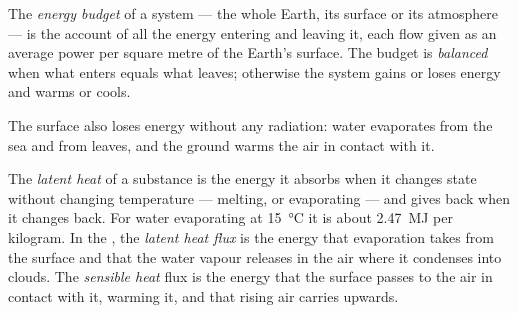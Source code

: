 \begin{definition}\label{def:g10:earth-energy-budget:energy-budget}
The \emph{energy budget} of a system --- the whole
Earth, its surface or its atmosphere --- is the account of all the energy
entering and leaving it, each flow given as an average power per square
metre of the Earth's surface. The budget is \emph{balanced} when what enters
equals what leaves; otherwise the system gains or loses energy and warms or
cools.
\end{definition}

The surface also loses energy without any radiation: water evaporates from
the sea and from leaves, and the ground warms the air in contact with it.

\begin{definition}\label{def:g10:earth-energy-budget:latent-heat}
The \emph{latent heat} of a substance is the energy it
absorbs when it changes state without changing temperature --- melting, or
evaporating --- and gives back when it changes back. For water evaporating
at \qty{15}{\degreeCelsius} it is about \qty{2.47}{MJ} per kilogram. In the
, the \emph{latent heat flux} is the energy that evaporation
takes from the surface and that the water vapour releases in the air where
it condenses into clouds. The \emph{sensible heat} flux
is the energy that the surface passes to the air in contact with it,
warming it, and that rising air carries upwards.
\end{definition}

